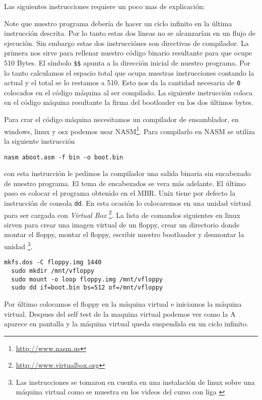 

Las siguientes instrucciones requiere un poco mas de explicación:



Note que nuestro programa debería de hacer un ciclo infinito en la última
instrucción descrita. Por lo tanto estas dos lineas no se alcanzarían en un
flujo de ejecución. Sin embargo estas dos instrucciónes son directivas de
compilador. La primera nos sirve para rellenar nuestro código binario
resultante para que ocupe 510 Bytes. El símbolo \texttt{\$\$} apunta a la
dirección inicial de nuestro programa. Por lo tanto calculamos el espacio total
que ocupa nuestras instrucciones contando la actual y el total se lo restamos a
510. Esto nos da la cantidad necesaria de \texttt{0} colocados en el código
máquina al ser compilado. La siguiente instrucción coloca en el código máquina
resultante la firma del bootloader en los dos últimos bytes.

Para crar el código máquina necesitamos un compilador de ensamblador, en
windows, linux y osx podemos usar NASM\footnote{\url{http://www.nasm.us}}. Para
compilarlo en NASM se utilíza la siguiente instrucción


\begin{lstlisting}[style=custombash, caption=Compilando el bootloader con NASM]
  nasm aboot.asm -f bin -o boot.bin
\end{lstlisting}

con esta instrucción le pedimos la compilador una salida binaria sin encabezado
de nuestro programa. El tema de encabezados se vera más adelante. El último
paso es colocar el programa obtenido en el MBR. Unix tiene por defecto la
instrucción de consola \texttt{dd}. En esta ocasión lo colocaremos en una
unidad virtual para ser cargada con \emph{Virtual Box} \footnote{\url{http://www.virtualbox.org}}.
La lista de comandos siguientes en linux sirven para crear una imagen virtual
de un floppy, crear un directorio donde montar el floppy, montar el floppy,
escribir nuestro bootloader y desmontar la unidad \footnote{Las instrucciones
  se tomaron en cuenta en una instalación de linux sobre una máquina virtual
  como se muestra en los videos del curso con liga \url{}}. 

\begin{lstlisting}[style=custombash, caption=Preparando un floppy virtual]
  mkfs.dos -C floppy.img 1440
  sudo mkdir /mnt/vfloppy
  sudo mount -o loop floppy.img /mnt/vfloppy 
  sudo dd if=boot.bin bs=512 of=/mnt/vfloppy
\end{lstlisting}

Por último colocamos el floppy en la máquina virtual e iniciamos la máquina
virtual. Despues del self test de la maquina virtual podemos ver como la A aparece en
pantalla y la máquina virtual queda suspendida en un ciclo infinito.

